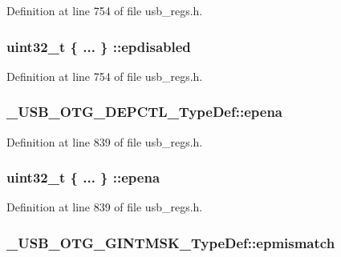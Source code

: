 Definition at line 754 of file usb\-\_\-regs.\-h.

\hypertarget{group___u_s_b___o_t_g___d_r_i_v_e_r_gac3dc0646aac16b6c718158f300d2dbb9}{
\subsubsection[{epdisabled}]{\setlength{\rightskip}{0pt plus 5cm}uint32\-\_\-t \{ ... \} \-::epdisabled}}\label{group___u_s_b___o_t_g___d_r_i_v_e_r_gac3dc0646aac16b6c718158f300d2dbb9}


Definition at line 754 of file usb\-\_\-regs.\-h.

\hypertarget{group___u_s_b___o_t_g___d_r_i_v_e_r_ga6cdb48720ad4a0114da47efd4055860b}{
\subsubsection[{epena}]{ \-\_\-\-U\-S\-B\-\_\-\-O\-T\-G\-\_\-\-D\-E\-P\-C\-T\-L\-\_\-\-Type\-Def\-::epena}}\label{group___u_s_b___o_t_g___d_r_i_v_e_r_ga6cdb48720ad4a0114da47efd4055860b}


Definition at line 839 of file usb\-\_\-regs.\-h.

\hypertarget{group___u_s_b___o_t_g___d_r_i_v_e_r_ga6439007cc5c799e81ea84988d0620e71}{
\subsubsection[{epena}]{\setlength{\rightskip}{0pt plus 5cm}uint32\-\_\-t \{ ... \} \-::epena}}\label{group___u_s_b___o_t_g___d_r_i_v_e_r_ga6439007cc5c799e81ea84988d0620e71}


Definition at line 839 of file usb\-\_\-regs.\-h.

\hypertarget{group___u_s_b___o_t_g___d_r_i_v_e_r_ga736d5ec17a44d4d40e8ad96c66c86887}{
\subsubsection[{epmismatch}]{ \-\_\-\-U\-S\-B\-\_\-\-O\-T\-G\-\_\-\-G\-I\-N\-T\-M\-S\-K\-\_\-\-Type\-Def\-::epmismatch}}\label{group___u_s_b___o_t_g___d_r_i_v_e_r_ga736d5ec17a44d4d40e8ad96c66c86887}



